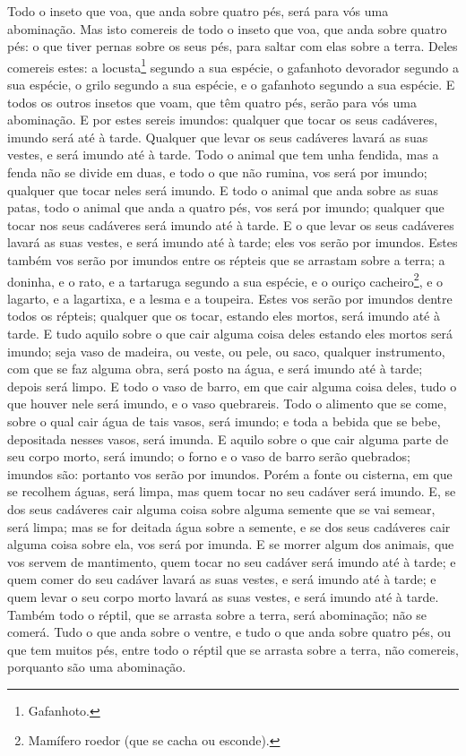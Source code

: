 Todo o inseto que voa, que anda sobre quatro pés, será para vós
uma abominação. Mas isto comereis de todo o inseto que voa,
que anda sobre quatro pés: o que tiver pernas sobre os seus pés,
para saltar com elas sobre a terra. Deles comereis estes: a
locusta\footnote{Gafanhoto.} segundo a sua espécie, o gafanhoto
devorador segundo a sua espécie, o grilo segundo a sua espécie, e o
gafanhoto segundo a sua espécie. E todos os outros insetos
que voam, que têm quatro pés, serão para vós uma abominação.
E por estes sereis imundos: qualquer que tocar os seus
cadáveres, imundo será até à tarde. Qualquer que levar os
seus cadáveres lavará as suas vestes, e será imundo até à tarde.
Todo o animal que tem unha fendida, mas a fenda não se divide
em duas, e todo o que não rumina, vos será por imundo; qualquer que
tocar neles será imundo. E todo o animal que anda sobre as
suas patas, todo o animal que anda a quatro pés, vos será por
imundo; qualquer que tocar nos seus cadáveres será imundo até à
tarde. E o que levar os seus cadáveres lavará as suas vestes,
e será imundo até à tarde; eles vos serão por imundos. Estes
também vos serão por imundos entre os répteis que se arrastam sobre
a terra; a doninha, e o rato, e a tartaruga segundo a sua espécie,
e o ouriço cacheiro\footnote{Mamífero roedor (que se cacha ou
esconde).}, e o lagarto, e a lagartixa, e a lesma e a toupeira.
Estes vos serão por imundos dentre todos os répteis; qualquer
que os tocar, estando eles mortos, será imundo até à tarde. E
tudo aquilo sobre o que cair alguma coisa deles estando eles mortos
será imundo; seja vaso de madeira, ou veste, ou pele, ou saco,
qualquer instrumento, com que se faz alguma obra, será posto na
água, e será imundo até à tarde; depois será limpo. E todo o
vaso de barro, em que cair alguma coisa deles, tudo o que houver
nele será imundo, e o vaso quebrareis. Todo o alimento que se
come, sobre o qual cair água de tais vasos, será imundo; e toda a
bebida que se bebe, depositada nesses vasos, será imunda. E
aquilo sobre o que cair alguma parte de seu corpo morto, será
imundo; o forno e o vaso de barro serão quebrados; imundos são:
portanto vos serão por imundos. Porém a fonte ou cisterna, em
que se recolhem águas, será limpa, mas quem tocar no seu cadáver
será imundo. E, se dos seus cadáveres cair alguma coisa sobre
alguma semente que se vai semear, será limpa; mas se for
deitada água sobre a semente, e se dos seus cadáveres cair alguma
coisa sobre ela, vos será por imunda. E se morrer algum dos
animais, que vos servem de mantimento, quem tocar no seu cadáver
será imundo até à tarde; e quem comer do seu cadáver lavará
as suas vestes, e será imundo até à tarde; e quem levar o seu corpo
morto lavará as suas vestes, e será imundo até à tarde.
Também todo o réptil, que se arrasta sobre a terra, será
abominação; não se comerá. Tudo o que anda sobre o ventre, e
tudo o que anda sobre quatro pés, ou que tem muitos pés, entre todo
o réptil que se arrasta sobre a terra, não comereis, porquanto são
uma abominação.

